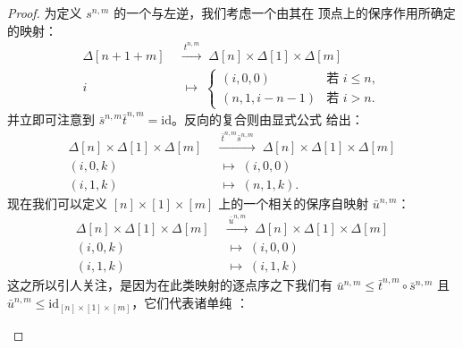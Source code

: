 \begin{proof}
为定义 $s^{n,m}$ 的一个\trSection{}与左\trHomotopy{}逆，我们考虑一个由其在
顶点上的保序作用所确定的映射：
\begin{equation*}
\begin{aligned}
\Delta[n+1+m]\;&\xrightarrow{\ t^{n,m}\ }\;\Delta[n]\times\Delta[1]\times\Delta[m]\\
i&\;\longmapsto\;
\begin{cases}
(i,0,0) & \text{若 } i\le n,\\
(n,1,i-n-1) & \text{若 } i>n.
\end{cases}
\end{aligned}
\end{equation*}
并立即可注意到 $\bar{s}^{n,m}\bar{t}^{n,m}=\mathrm{id}$。反向的复合则由显式公式%
给出：
\begin{equation*}
\begin{aligned}
\Delta[n]\times\Delta[1]\times\Delta[m]\;&\xrightarrow{\ \bar{t}^{n,m}\bar{s}^{n,m}\ }\;\Delta[n]\times\Delta[1]\times\Delta[m]\\
(i,0,k)&\;\longmapsto\;(i,0,0)\\
(i,1,k)&\;\longmapsto\;(n,1,k)\mbox{.}
\end{aligned}
\end{equation*}
现在我们可以定义 $[n]\times[1]\times[m]$ 上的一个相关的保序自映射%
$\bar{u}^{n,m}$：
\begin{equation*}
\begin{aligned}
\Delta[n]\times\Delta[1]\times\Delta[m]\;&\xrightarrow{\ \bar{u}^{n,m}\ }\;\Delta[n]\times\Delta[1]\times\Delta[m]\\
(i,0,k)&\;\longmapsto\;(i,0,0)\\
(i,1,k)&\;\longmapsto\;(i,1,k)
\end{aligned}
\end{equation*}
这之所以引人关注，是因为在此类映射的逐点序之下我们有
$\bar{u}^{n,m}\le\bar{t}^{n,m}\circ\bar{s}^{n,m}$ 且
$\bar{u}^{n,m}\le\mathrm{id}_{[n]\times[1]\times[m]}$，它们代表诸单纯%
\trHomotopy：
\begin{center}
\end{center}
\end{proof}
